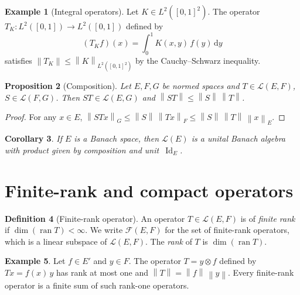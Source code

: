 \documentclass[a4paper,12pt]{book}
\DeclareMathOperator{\Id}{Id}
\DeclareMathOperator{\ran}{ran}
\newcommand{\dd}{\mathrm{d}}
\newcommand{\norm}[1]{\left\| #1 \right\|}
\theoremstyle{definition}
\newtheorem{definition}{Definition}[chapter]
\newtheorem{example}[definition]{Example}
\theoremstyle{plain}
\newtheorem{proposition}[definition]{Proposition}
\newtheorem{corollary}[definition]{Corollary}
\theoremstyle{remark}
\begin{document}
\begin{example}[Integral operators]\label{ex:integral-op}
Let $K\in L^2([0,1]^2)$. The operator $T_K\colon L^2([0,1])\to L^2([0,1])$
defined by
\[
  (T_K f)(x) = \int_0^1 K(x,y)\,f(y)\,\dd y
\]
satisfies $\norm{T_K}\leq \norm{K}_{L^2([0,1]^2)}$ by the Cauchy--Schwarz
inequality.
\end{example}

\begin{proposition}[Composition]\label{prop:composition-ops}
Let $E,F,G$ be normed spaces and $T\in\mathcal{L}(E,F)$, $S\in\mathcal{L}(F,G)$.
Then $ST\in\mathcal{L}(E,G)$ and $\norm{ST}\leq\norm{S}\,\norm{T}$.
\end{proposition}

\begin{proof}
For any $x\in E$,
$\norm{STx}_G \leq \norm{S}\,\norm{Tx}_F \leq \norm{S}\,\norm{T}\,\norm{x}_E$.
\end{proof}

\begin{corollary}\label{cor:LE-algebra}
If $E$ is a Banach space, then $\mathcal{L}(E)$ is a unital Banach algebra with
product given by composition and unit~$\Id_E$.
\end{corollary}

\section{Finite-rank and compact operators}

\begin{definition}[Finite-rank operator]\label{def:finite-rank}
An operator $T\in\mathcal{L}(E,F)$ is of \emph{finite rank} if $\dim(\ran T)<\infty$.
We write $\mathcal{F}(E,F)$ for the set of
finite-rank operators, which is a linear subspace of $\mathcal{L}(E,F)$.
The \emph{rank} of $T$ is $\dim(\ran T)$.
\end{definition}

\begin{example}\label{ex:rank-one}
Let $f\in E'$ and $y\in F$. The operator $T = y\otimes f$
defined by $Tx = f(x)\,y$ has rank at most one and $\norm{T}=\norm{f}\,\norm{y}$.
Every finite-rank operator is a finite sum of such rank-one operators.
\end{example}
\end{document}
